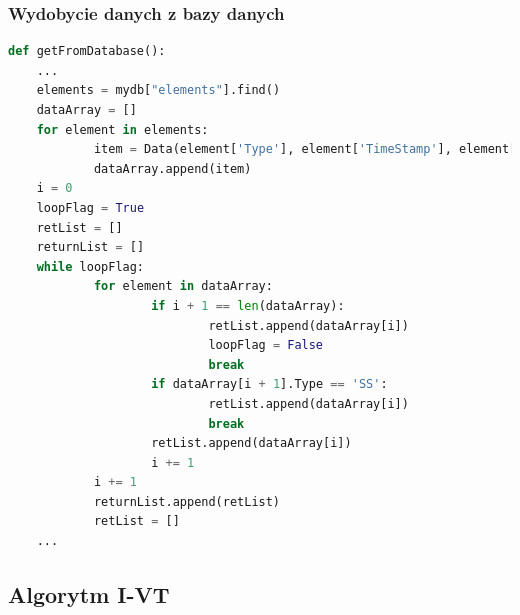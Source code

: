 \subsubsection{Wydobycie danych z bazy danych}
\begin{lstlisting}[language=Python, caption=Wydobycie danych z bazy danych, label={lst:getFromDB}]
def getFromDatabase():
    ...
    elements = mydb["elements"].find()
    dataArray = []
    for element in elements:
            item = Data(element['Type'], element['TimeStamp'], element['CoordX'], element['CoordY'])
            dataArray.append(item)
    i = 0
    loopFlag = True
    retList = []
    returnList = []
    while loopFlag:
            for element in dataArray:
                    if i + 1 == len(dataArray):
                            retList.append(dataArray[i])
                            loopFlag = False
                            break
                    if dataArray[i + 1].Type == 'SS':
                            retList.append(dataArray[i])
                            break
                    retList.append(dataArray[i])
                    i += 1
            i += 1
            returnList.append(retList)
            retList = []
    ...
    \end{lstlisting}
\subsection{Algorytm I-VT}
\blindtext
